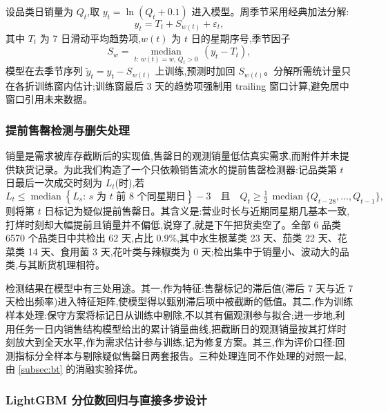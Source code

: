 设品类日销量为 $Q_t$,取 $y_t=\ln(Q_t+0.1)$ 进入模型。周季节采用经典加法分解:
\begin{equation}
  y_t = T_t + S_{w(t)} + \varepsilon_t,
\end{equation}
其中 $T_t$ 为 7 日滑动平均趋势项,$w(t)$ 为 $t$ 日的星期序号,季节因子
\begin{equation}
  S_w = \operatorname*{median}_{t:\,w(t)=w,\,Q_t>0}\,\left(y_t - T_t\right),
\end{equation}
模型在去季节序列 $\tilde{y}_t = y_t - S_{w(t)}$ 上训练,预测时加回 $S_{w(t)}$。分解所需统计量只在各折训练窗内估计;训练窗最后 3 天的趋势项强制用 trailing 窗口计算,避免居中窗口引用未来数据。

\subsubsection{提前售罄检测与删失处理}
\label{subsec:censor}

销量是需求被库存截断后的实现值,售罄日的观测销量低估真实需求,而附件并未提供缺货记录。为此我们构造了一个只依赖销售流水的提前售罄检测器:记品类第 $t$ 日最后一次成交时刻为 $L_t$(时),若
\begin{equation}
  L_t \le \operatorname*{median}\left\{L_{s}:\, s \text{ 为 } t \text{ 前 8 个同星期日}\right\} - 3
  \quad\text{且}\quad
  Q_t \ge \tfrac{1}{2}\,\operatorname*{median}\{Q_{t-28},\dots,Q_{t-1}\},
  \label{eq:censor}
\end{equation}
则将第 $t$ 日标记为疑似提前售罄日。其含义是:营业时长与近期同星期几基本一致,打烊时刻却大幅提前且销量并不偏低,说穿了,就是下午把货卖空了。全部 6 品类 6570 个品类日中共检出 62 天,占比 0.9\%,其中水生根茎类 23 天、茄类 22 天、花菜类 14 天、食用菌 3 天,花叶类与辣椒类为 0 天;检出集中于销量小、波动大的品类,与其断货机理相符。

检测结果在模型中有三处用途。其一,作为特征:售罄标记的滞后值(滞后 7 天与近 7 天检出频率)进入特征矩阵,使模型得以甄别滞后项中被截断的低值。其二,作为训练样本处理:保守方案将标记日从训练中剔除,不以其有偏观测参与拟合;进一步地,利用任务一日内销售结构模型给出的累计销量曲线,把截断日的观测销量按其打烊时刻放大到全天水平,作为需求估计参与训练,记为修复方案。其三,作为评价口径:回测指标分全样本与剔除疑似售罄日两套报告。三种处理连同不作处理的对照一起,由 \ref{subsec:bt} 的消融实验择优。

\subsubsection{LightGBM 分位数回归与直接多步设计}

